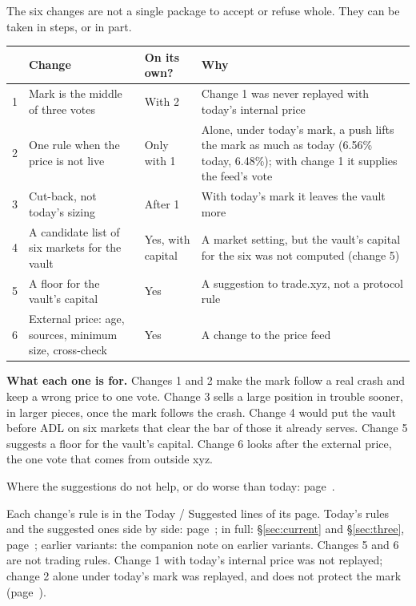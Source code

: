 The six changes are not a single package to accept or refuse whole. They can be taken in steps, or in part.

{\normalsize\renewcommand{\arraystretch}{1.25}
\begin{tabularx}{\textwidth}{@{}r>{\raggedright\arraybackslash}p{4.6cm}>{\raggedright\arraybackslash}p{2.4cm}>{\raggedright\arraybackslash}X@{}}
\toprule
 & Change & On its own? & Why\\
\midrule
1 & Mark is the middle of three votes & With 2 & Change 1 was never replayed with today's internal price\\
2 & One rule when the price is not live & Only with 1 & Alone, under today's mark, a push lifts the mark as much as today (6.56\% today, 6.48\%); with change 1 it supplies the feed's vote\\
3 & Cut-back, not today's sizing & After 1 & With today's mark it leaves the vault more\\
4 & A candidate list of six markets for the vault & Yes, with capital & A market setting, but the vault's capital for the six was not computed (change 5)\\
5 & A floor for the vault's capital & Yes & A suggestion to trade.xyz, not a protocol rule\\
6 & External price: age, sources, minimum size, cross-check & Yes & A change to the price feed\\
\bottomrule
\end{tabularx}}


\vspace{1.5ex}
\textbf{What each one is for.} Changes 1 and 2 make the mark follow a real crash and keep a wrong price to one vote. Change 3 sells a large position in trouble sooner, in larger pieces, once the mark follows the crash. Change 4 would put the vault before ADL on six markets that clear the bar of those it already serves. Change 5 suggests a floor for the vault's capital. Change 6 looks after the external price, the one vote that comes from outside xyz.

Where the suggestions do not help, or do worse than today: page~\pageref{sec:costs}.

\foot
\begin{exact}
Each change's rule is in the Today / Suggested lines of its page. Today's rules and the suggested ones side by side: page~\pageref{sec:formulas}; in full: \S\ref{sec:current} and \S\ref{sec:three}, page~\pageref{sec:three}; earlier variants: the companion note on earlier variants. Changes 5 and 6 are not trading rules. Change 1 with today's internal price was not replayed; change 2 alone under today's mark was replayed, and does not protect the mark (page~\pageref{sec:notlive}).
\end{exact}

